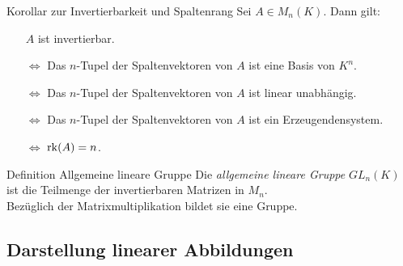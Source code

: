\documentclass[main.tex]{subfiles}
\begin{document}
\begin{karte}{Korollar zur Invertierbarkeit und Spaltenrang}
    Sei \(A \in M_n(K)\). Dann gilt:
    \begin{itemize}
        \item[] \(A\) ist invertierbar.
        \item[\(\Leftrightarrow\)] Das \(n\)-Tupel der 
        Spaltenvektoren von \(A\) ist eine Basis von \(K^n\).
        \item[\(\Leftrightarrow\)] Das \(n\)-Tupel der 
        Spaltenvektoren von \(A\) ist linear unabhängig.
        \item[\(\Leftrightarrow\)] Das \(n\)-Tupel der 
        Spaltenvektoren von \(A\) ist ein Erzeugendensystem. 
        \item[\(\Leftrightarrow\)] \(\operatorname{rk}(A) = n\).        
    \end{itemize}
\end{karte}
\begin{karte}{Definition Allgemeine lineare Gruppe}
    Die \textit{allgemeine lineare Gruppe} \(GL_n(K)\) ist die Teilmenge 
    der invertierbaren Matrizen in \(M_n\). \\ 
    Bezüglich der Matrixmultiplikation bildet sie eine Gruppe.
\end{karte}

\subsection*{Darstellung linearer Abbildungen}  
\end{document}
